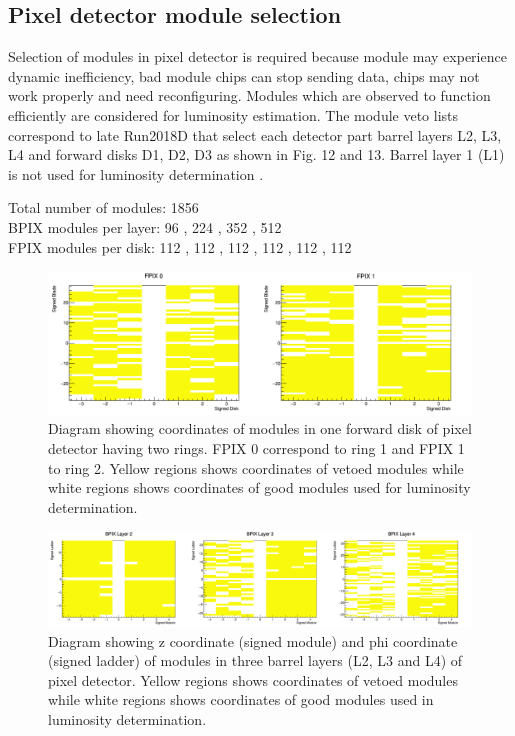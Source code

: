 \subsection{Pixel detector module selection}
Selection of modules in pixel detector is required because module may experience dynamic inefficiency, bad module chips can stop sending data, chips may not work properly and need reconfiguring. Modules which are observed to function efficiently are considered for luminosity estimation. The module veto lists correspond to late Run2018D that select each detector part barrel layers L2, L3, L4 and forward disks D1, D2, D3 as shown in Fig. 12 and 13. Barrel layer 1 (L1) is not used for luminosity determination \cite{vetolist}. \\

\begin{flushleft}
Total number of modules: 1856 \\
BPIX modules per layer:  96 , 224 , 352 , 512\\
FPIX modules per disk:  112 , 112 , 112 , 112 , 112 , 112\\
\end{flushleft}

\begin{figure}[H]
  \centering
  \includegraphics[width=0.8 \columnwidth]{./PDDisk_R12.png}
  \caption{ \onehalfspacing Diagram showing coordinates of modules in one forward disk of pixel detector having two rings. FPIX 0 correspond to ring 1 and FPIX 1 to ring 2. Yellow regions shows coordinates of vetoed modules while white regions shows coordinates of good modules used for luminosity determination.}
  \label{fig:CMS}
\end{figure}

\begin{figure}[H]
  \centering
  \includegraphics[width=1 \columnwidth]{./bpixL2-L4.png}
  \caption{ \onehalfspacing Diagram showing z coordinate (signed module) and phi coordinate (signed ladder) of modules in three barrel layers (L2, L3 and L4) of pixel detector. Yellow regions shows coordinates of vetoed modules while white regions shows coordinates of good modules used in luminosity determination. }
  \label{fig:CMS}
\end{figure}




\clearpage\newpage

